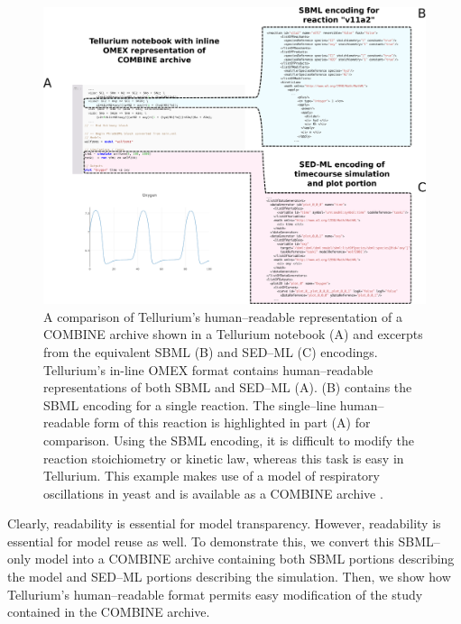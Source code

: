 \documentclass[10pt,letterpaper]{article}
\begin{document}
\begin{figure}
  \includegraphics[width=\textwidth]{fig-comparison2.pdf}
  \caption{A comparison of Tellurium's human--readable representation of a COMBINE archive shown in a Tellurium notebook (A) and excerpts from the equivalent SBML (B) and SED--ML (C) encodings. Tellurium's in-line OMEX format contains human--readable representations of both SBML and SED--ML (A). (B) contains the SBML encoding for a single reaction. The single--line human--readable form of this reaction is highlighted in part (A) for comparison. Using the SBML encoding, it is difficult to modify the reaction stoichiometry or kinetic law, whereas this task is easy in Tellurium. This example makes use of a model of respiratory oscillations in yeast \cite{wolf2001mathematical} and is available as a COMBINE archive \cite{wolfoxy}. }
  \label{fig:comparison}
\end{figure}

Clearly, readability is essential for model transparency. However, readability is essential for model reuse as well. To demonstrate this, we convert this SBML--only model into a COMBINE archive containing both SBML portions describing the model and SED--ML portions describing the simulation.  Then, we show how Tellurium's human--readable format permits easy modification of the study contained in the COMBINE archive.
\end{document}
